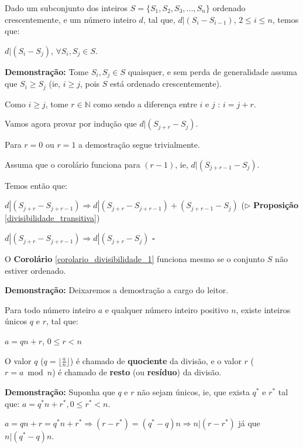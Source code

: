 \begin{corollary}\label{corolario_divisibilidade_1}
Dado um subconjunto dos inteiros $S = \{S_1, S_2, S_3, ..., S_n\}$ ordenado crescentemente, e um número inteiro $d$, tal que, $d|(S_i-S_{i-1})$, $2 \leq i \leq n$, 
temos que: 

$d|(S_i-S_j)$, $\forall S_i, S_j \in S$.

\end{corollary}
\textbf{Demonstração:}
Tome $S_i,S_j \in S$ quaisquer, e sem perda de generalidade assuma que $S_i \geq S_j$ (ie, $i \geq j$, pois $S$ está ordenado crescentemente).

Como $i \geq j$, tome $r \in \mathbb{N}$ como sendo a diferença entre $i$ e $j$ : $i = j + r$.

Vamos agora provar por indução que $d|(S_{j+r}-S_j)$.

Para $r=0$ ou $r=1$ a demostração segue trivialmente.

Assuma que o corolário funciona para $(r-1)$, ie, $d|(S_{j+r-1}-S_j)$. 

Temos então que: 

$d|(S_{j+r}-S_{j+r-1}) \Rightarrow d|(S_{j+r}-S_{j+r-1})+(S_{j+r-1}-S_j)$ ($\triangleright$ \textbf{Proposição} \autoref{divisibilidade_transitiva})

$d|(S_{j+r}-S_{j+r-1}) \Rightarrow d|(S_{j+r}-S_j)$ $\square$ 


\begin{corollary}\label{corolario_divisibilidade_1.1}
O \textbf{Corolário} \autoref{corolario_divisibilidade_1} funciona mesmo se o conjunto $S$ não estiver ordenado.
\end{corollary}
\textbf{Demonstração:}
Deixaremos a demostração a cargo do leitor.


\begin{theorem}\label{algoritmo_divisao}
Para todo número inteiro $a$ e qualquer número inteiro positivo $n$, existe inteiros únicos $q$ e $r$, tal que:

$a = qn + r$, $0 \leq r < n$

O valor $q$ ($q = \lfloor  \frac{a}{n} \rfloor$) é chamado de \textbf{quociente} da divisão, e o valor $r$ ($r = a \bmod n$) é chamado de \textbf{resto}
(ou \textbf{resíduo}) da divisão.
\end{theorem}
\textbf{Demonstração:}
Suponha que $q$ e $r$ não sejam únicos, ie, que exista $q^*$ e $r^*$ tal que: $a = q^*n + r^*, 0 \leq r^* < n$.

$a = qn + r = q^*n + r^* \Rightarrow (r - r^*) = (q^* - q)n \Rightarrow n|(r - r^*)$ já que $n|(q^* - q)n$.

